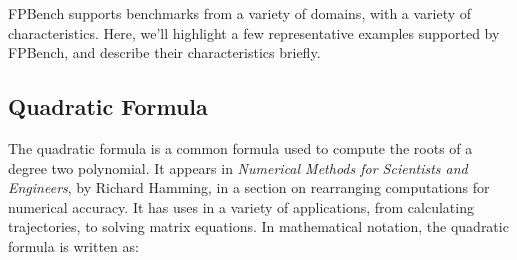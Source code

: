 \documentclass[main.tex]{subfiles}
\begin{document}
FPBench supports benchmarks from a variety of domains, with a variety
of characteristics. Here, we'll highlight a few representative
examples supported by FPBench, and describe their characteristics
briefly.

\subsection{Quadratic Formula}

The quadratic formula is a common formula used to compute the roots of
a degree two polynomial. It appears in \textit{Numerical Methods for
  Scientists and Engineers}, by Richard Hamming, in a section on
rearranging computations for numerical accuracy. It has uses in a
variety of applications, from calculating trajectories, to solving
matrix equations. In mathematical notation, the quadratic formula is
written as:
\end{document}
